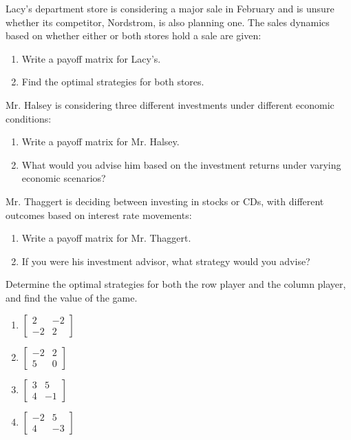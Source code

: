 \begin{puzzle}
    Lacy's department store is considering a major sale in February and is unsure whether its competitor, Nordstrom, is also planning one. The sales dynamics based on whether either or both stores hold a sale are given:
    \begin{enumerate}
        \item Write a payoff matrix for Lacy's.
        \item Find the optimal strategies for both stores.
    \end{enumerate}
\end{puzzle}

\begin{puzzle}
    Mr. Halsey is considering three different investments under different economic conditions:
    \begin{enumerate}
        \item Write a payoff matrix for Mr. Halsey.
        \item What would you advise him based on the investment returns under varying economic scenarios?
    \end{enumerate}
\end{puzzle}

\begin{puzzle}
    Mr. Thaggert is deciding between investing in stocks or CDs, with different outcomes based on interest rate movements:
    \begin{enumerate}
        \item Write a payoff matrix for Mr. Thaggert.
        \item If you were his investment advisor, what strategy would you advise?
    \end{enumerate}
\end{puzzle}


\begin{puzzle}
    Determine the optimal strategies for both the row player and the column player, and find the value of the game.
    \begin{enumerate}
        \item $\begin{bmatrix} 2 & -2 \\ -2 & 2 \end{bmatrix}$
        \item $\begin{bmatrix} -2 & 2 \\ 5 & 0 \end{bmatrix}$
        \item $\begin{bmatrix} 3 & 5 \\ 4 & -1 \end{bmatrix}$
        \item $\begin{bmatrix} -2 & 5 \\ 4 & -3 \end{bmatrix}$
    \end{enumerate}
\end{puzzle}

